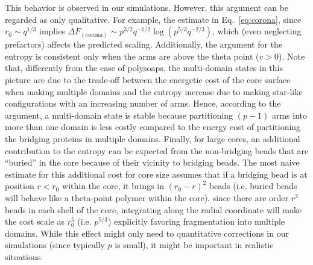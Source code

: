 \documentclass[
preprint,
a4paper,
12pt,
superscriptaddress,
pre]{revtex4}
\begin{document}
This behavior is observed in our simulations.  However, this argument
can be regarded as only qualitative. For example, the estimate in
Eq.~\eqref{eq:corona}, since $r_0 \sim q^{1/3}$ implies $ \Delta
F_{\mathrm{(corona)}} \sim p^{3/2}q^{-1/2} \log\left( p^{5/3}q^{-2/3}
\right)$, which (even neglecting prefactors) affects the predicted
scaling. Additionally, the argument for the entropy is consistent only
when the arms are above the theta point ($v>0$).
Note that, differently from the case of polysoaps, the multi-domain
states in this picture are due to the trade-off between the energetic
cost of the core surface when making multiple domains and the entropy
increase due to making star-like configurations with an increasing
number of arms.  Hence, according to the argument, a multi-domain
state is stable because partitioning $(p-1)$ arms into more than one
domain is less costly compared to the energy cost of partitioning the
bridging proteins in multiple domains.
Finally, for large cores, an additional contribution to the entropy
can be expected from the non-bridging beads that are ``buried'' in the
core because of their vicinity to bridging beads. The most naive
estimate for this additional cost for core size assumes that if a
bridging bead is at position $r<r_0$ within the core, it brings in
$(r_0 -r)^2$ beads (i.e. buried beads will behave like a theta-point
polymer within the core). since there are order $r^2$ beads in each
shell of the core, integrating along the radial coordinate will make
the cost scale as $r_0^5$ (i.e. $p^{5/3}$) explicitly favoring
fragmentation into multiple domains. While this effect might only need
to quantitative corrections in our simulations (since typically $p$ is
small), it might be important in realistic situations.
\end{document}
